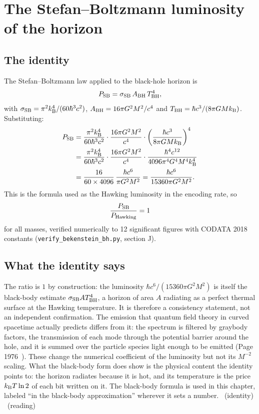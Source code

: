 \section{The Stefan--Boltzmann luminosity of the horizon}\label{sec:bh_sb}
\subsection{The identity}
The Stefan--Boltzmann law applied to the black-hole horizon is
\begin{equation}
P_{\rm SB}=\sigma_{\rm SB}\,A_{\rm BH}\,T_{\rm BH}^4,
\end{equation}
with $\sigma_{\rm SB}=\pi^2k_{\mathrm B}^4/(60\hbar^3c^2)$, $A_{\rm BH}=16\pi G^2M^2/c^4$ and $T_{\rm BH}=\hbar c^3/(8\pi GMk_{\mathrm B})$. Substituting:
\begin{align}
P_{\rm SB}&=\frac{\pi^2k_{\mathrm B}^4}{60\hbar^3c^2}\cdot\frac{16\pi G^2M^2}{c^4}\cdot\left(\frac{\hbar c^3}{8\pi GMk_{\mathrm B}}\right)^4\notag\\
&=\frac{\pi^2k_{\mathrm B}^4}{60\hbar^3c^2}\cdot\frac{16\pi G^2M^2}{c^4}\cdot\frac{\hbar^4c^{12}}{4096\pi^4G^4M^4k_{\mathrm B}^4}\notag\\
&=\frac{16}{60\times4096}\,\frac{\hbar c^6}{\pi G^2M^2}=\frac{\hbar c^6}{15360\pi G^2M^2}.\label{eq:bh_PSB}
\end{align}
This is the formula used as the Hawking luminosity in the encoding rate, so
\begin{equation}
\frac{P_{\rm SB}}{P_{\rm Hawking}}=1
\end{equation}
for all masses, verified numerically to 12 significant figures with CODATA 2018 constants (\texttt{verify\_bekenstein\_bh.py}, section J). \derived

\subsection{What the identity says}
The ratio is $1$ by construction: the luminosity $\hbar c^6/(15360\pi G^2M^2)$ is itself the black-body estimate $\sigma_{\rm SB}AT_{\rm BH}^4$, a horizon of area $A$
radiating as a perfect thermal surface at the Hawking temperature. It is therefore a consistency statement, not an independent confirmation. The
emission that quantum field theory in curved spacetime actually predicts differs from it: the spectrum is filtered by graybody factors, the transmission
of each mode through the potential barrier around the hole, and it is summed over the particle species light enough to be emitted (Page 1976~\cite{Page1976}).
These change the numerical coefficient of the luminosity but not its $M^{-2}$ scaling. What the black-body form does show is the physical content the
identity points to: the horizon radiates because it is hot, and its temperature is the price $k_{\mathrm B} T\ln2$ of each bit written on it. The black-body formula is
used in this chapter, labeled ``in the black-body approximation'' wherever it sets a number. \derived\ (identity) \interp\ (reading)

